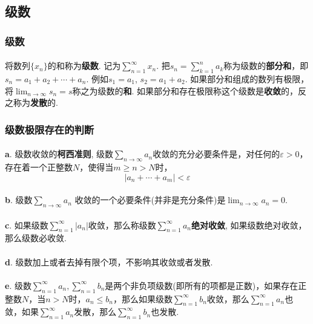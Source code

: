 \subsection{级数}

\subsubsection{级数}
\paragraph{}
将数列$\{x_n\}$的和称为\textbf{级数}. 记为$\sum_{n=1}^\infty x_n$.  把$s_n = \sum_{k=1}^n a_k$称为级数的\textbf{部分和}，即$s_n = a_1 + a_2 + \cdots + a_n$. 例如$s_1 = a_1$, $s_2 = a_1 + a_2$.  如果部分和组成的数列有极限，将$\lim_{n\to \infty} s_n = s$称之为级数的\textbf{和}. 如果部分和存在极限称这个级数是\textbf{收敛}的，反之称为\textbf{发散}的.

\subsubsection{级数极限存在的判断}
\paragraph{}
\textbf{a}. 级数收敛的\textbf{柯西准则}, 级数$\sum_{n\to \infty} a_n$收敛的充分必要条件是，对任何的$\varepsilon > 0$，存在着一个正整数$N$，使得当$m \geq n > N$时，
$$
|a_n + \cdots + a_m| < \varepsilon
$$

\paragraph{}
\textbf{b}. 级数$\sum_{n\to \infty} a_n$ 收敛的一个必要条件(并非是充分条件)是$\lim_{n\to \infty} a_n = 0$.

\paragraph{}
\textbf{c}. 如果级数$\sum_{n=1}^\infty |a_n|$收敛，那么称级数$\sum_{n=1}^\infty a_n$\textbf{绝对收敛}, 如果级数绝对收敛，那么级数必收敛.

\paragraph{}
\textbf{d}. 级数加上或者去掉有限个项，不影响其收敛或者发散.

\paragraph{}
\textbf{e}. 级数$\sum_{n=1}^\infty a_n, \sum_{n=1}^\infty b_n$是两个非负项级数(即所有的项都是正数)，如果存在正整数$N$，当$n > N$时，$a_n \leq b_n$，那么如果级数$\sum_{n=1}^\infty b_n$收敛，那么$\sum_{n=1}^\infty a_n$也敛，如果$\sum_{n=1}^\infty a_n$发散，那么$\sum_{n=1}^\infty b_n$也发散.

